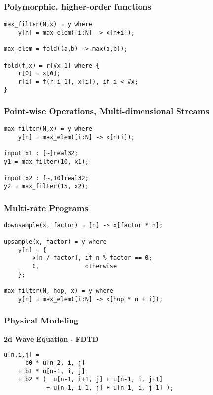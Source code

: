 \documentclass{beamer}
\begin{document}
\begin{frame}[fragile]
\frametitle{Polymorphic, higher-order functions}

\begin{center}
\begin{BVerbatim}
max_filter(N,x) = y where
    y[n] = max_elem([i:N] -> x[n+i]);

max_elem = fold((a,b) -> max(a,b));

fold(f,x) = r[#x-1] where {
    r[0] = x[0];
    r[i] = f(r[i-1], x[i]), if i < #x;
}
\end{BVerbatim}
\end{center}

\end{frame}



\begin{frame}[fragile]
\frametitle{Point-wise Operations, Multi-dimensional Streams}

\begin{center}
\begin{BVerbatim}
max_filter(N,x) = y where
    y[n] = max_elem([i:N] -> x[n+i]);

input x1 : [~]real32;
y1 = max_filter(10, x1);

input x2 : [~,10]real32;
y2 = max_filter(15, x2);
\end{BVerbatim}
\end{center}

\end{frame}


\begin{frame}[fragile]
\frametitle{Multi-rate Programs}

\begin{center}
\begin{BVerbatim}
downsample(x, factor) = [n] -> x[factor * n];

upsample(x, factor) = y where
    y[n] = {
        x[n / factor], if n %
        0,             otherwise
    };

max_filter(N, hop, x) = y where
    y[n] = max_elem([i:N] -> x[hop * n + i]);
\end{BVerbatim}
\end{center}

\end{frame}


\begin{frame}[fragile]
\frametitle{Physical Modeling}

\textbf{2d Wave Equation - FDTD\footnotemark}
\begin{center}
\begin{BVerbatim}
u[n,i,j] =
      b0 * u[n-2, i, j]
    + b1 * u[n-1, i, j]
    + b2 * (  u[n-1, i+1, j] + u[n-1, i, j+1]
            + u[n-1, i-1, j] + u[n-1, i, j-1] );
\end{BVerbatim}
\end{center}

\end{frame}
\end{document}
